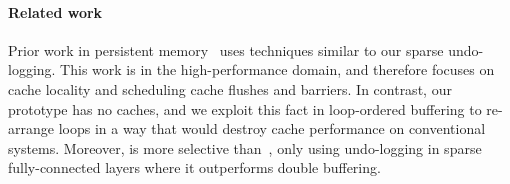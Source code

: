 \paragraph{Related work}
Prior work in persistent memory~\cite{elnawawy2017efficient} uses techniques similar to
our sparse undo-logging.
This work is in the high-performance domain,
and therefore focuses on cache locality and scheduling cache flushes and barriers.
In contrast, our prototype has no caches,
and we exploit this fact in loop-ordered buffering to re-arrange loops in a way that would destroy cache performance on conventional systems.
Moreover, \sonic is more selective than~\cite{elnawawy2017efficient},
only using undo-logging in sparse fully-connected layers where it outperforms double buffering.
